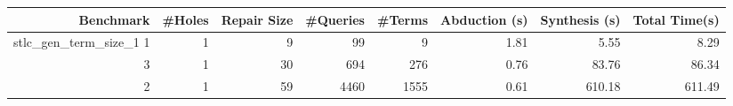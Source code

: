 \begin{tabular}{r|rr|rrrrr}
\hline
              Benchmark &   \#Holes &   Repair Size &   \#Queries &   \#Terms &   Abduction (s) &   Synthesis (s) &   Total Time(s) \\
\hline
 stlc\_gen\_term\_size\_1 1 &        1 &             9 &         99 &        9 &            1.81 &            5.55 &            8.29 \\
                      3 &        1 &            30 &        694 &      276 &            0.76 &           83.76 &           86.34 \\
                      2 &        1 &            59 &       4460 &     1555 &            0.61 &          610.18 &          611.49 \\
\hline
\end{tabular}